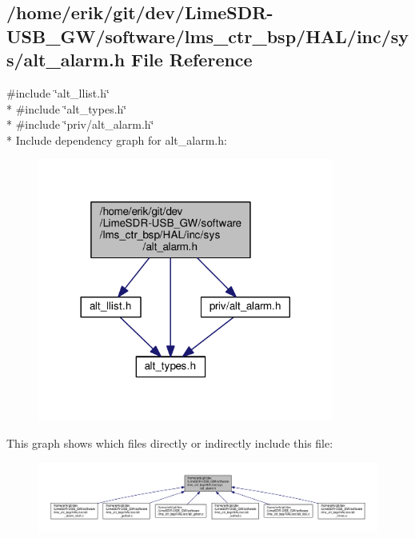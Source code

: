 \subsection{/home/erik/git/dev/\+Lime\+S\+D\+R-\/\+U\+S\+B\+\_\+\+G\+W/software/lms\+\_\+ctr\+\_\+bsp/\+H\+A\+L/inc/sys/alt\+\_\+alarm.h File Reference}
\label{sys_2alt__alarm_8h}
{\ttfamily \#include \char`\"{}alt\+\_\+llist.\+h\char`\"{}}\\*
{\ttfamily \#include \char`\"{}alt\+\_\+types.\+h\char`\"{}}\\*
{\ttfamily \#include \char`\"{}priv/alt\+\_\+alarm.\+h\char`\"{}}\\*
Include dependency graph for alt\+\_\+alarm.\+h\+:
\nopagebreak
\begin{figure}[H]
\begin{center}
\leavevmode
\includegraphics[width=276pt]{de/dda/sys_2alt__alarm_8h__incl}
\end{center}
\end{figure}
This graph shows which files directly or indirectly include this file\+:
\nopagebreak
\begin{figure}[H]
\begin{center}
\leavevmode
\includegraphics[width=350pt]{d3/d9b/sys_2alt__alarm_8h__dep__incl}
\end{center}
\end{figure}
